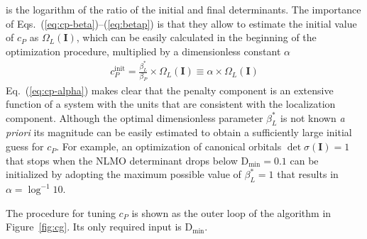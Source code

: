 \documentclass[aps,prl,reprint,amsmath,amssymb]{revtex4-1}
\begin{document}
%
is the logarithm of the ratio of the initial and final determinants. 
The importance of Eqs.~(\ref{eq:cp-beta})--(\ref{eq:betap}) is that they allow to estimate the initial value of $c_P$ as $\Omega_L(\mathbf{I})$, which can be easily calculated in the beginning of the optimization procedure, multiplied by a dimensionless constant $\alpha$
%
\begin{equation} \label{eq:cp-alpha}
\begin{split}
c_{P}^{\text{init}} = \frac{ \beta_L^{\ast} }{ \beta_P } \times \Omega_L(\mathbf{I}) \equiv \alpha \times \Omega_L(\mathbf{I})
\end{split}
\end{equation}
%
Eq.~(\ref{eq:cp-alpha}) makes clear that the penalty component is an extensive function of a system with the units that are consistent with the localization component. Although the optimal dimensionless parameter $\beta_L^{\ast}$ is not known \emph{a priori} its magnitude can be easily estimated to obtain a sufficiently large initial guess for $c_P$. For example, an optimization of canonical orbitals $\det \sigma(\mathbf{I})=1$ that stops when the NLMO determinant drops below $\text{D}_{\text{min}} = 0.1$ can be initialized by adopting the maximum possible value of $\beta_L^{\ast} = 1$ that results in $\alpha = \log^{-1} 10$.

The procedure for tuning $c_P$ is shown as the outer loop of the algorithm in Figure~\ref{fig:cg}. Its only required input is $\text{D}_{\text{min}}$. %


\end{document}
